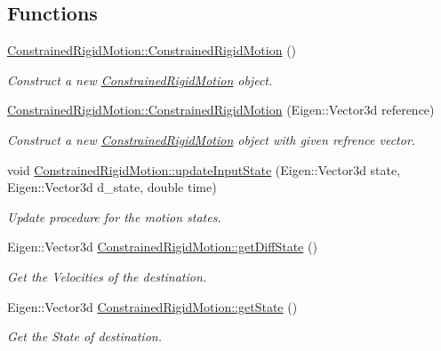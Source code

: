 \subsection*{Functions}
\begin{DoxyCompactItemize}
\item 
\mbox{\label{group__RigidMotion_gaa85deb237e7407287829b6596997b210}} 
\hyperlink{group__RigidMotion_gaa85deb237e7407287829b6596997b210}{Constrained\+Rigid\+Motion\+::\+Constrained\+Rigid\+Motion} ()
\begin{DoxyCompactList}\small\item\em Construct a new \hyperlink{classConstrainedRigidMotion}{Constrained\+Rigid\+Motion} object. \end{DoxyCompactList}\item 
\hyperlink{group__RigidMotion_ga603d9727e46dc49dcf22b24870d15779}{Constrained\+Rigid\+Motion\+::\+Constrained\+Rigid\+Motion} (Eigen\+::\+Vector3d reference)
\begin{DoxyCompactList}\small\item\em Construct a new \hyperlink{classConstrainedRigidMotion}{Constrained\+Rigid\+Motion} object with given refrence vector. \end{DoxyCompactList}\item 
void \hyperlink{group__RigidMotion_ga80649fcba3aed41550ba463f405d051b}{Constrained\+Rigid\+Motion\+::update\+Input\+State} (Eigen\+::\+Vector3d state, Eigen\+::\+Vector3d d\+\_\+state, double time)
\begin{DoxyCompactList}\small\item\em Update procedure for the motion states. \end{DoxyCompactList}\item 
Eigen\+::\+Vector3d \hyperlink{group__RigidMotion_ga59bdced4bb2e565bc39312e5328507ef}{Constrained\+Rigid\+Motion\+::get\+Diff\+State} ()
\begin{DoxyCompactList}\small\item\em Get the Velocities of the destination. \end{DoxyCompactList}\item 
Eigen\+::\+Vector3d \hyperlink{group__RigidMotion_gabde902d2f91035cd5054a33dab4acc48}{Constrained\+Rigid\+Motion\+::get\+State} ()
\begin{DoxyCompactList}\small\item\em Get the State of destination. \end{DoxyCompactList}\item 

\end{DoxyCompactItemize}
